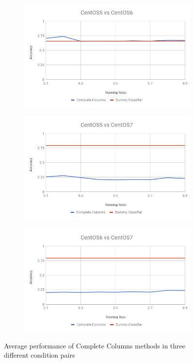 \documentclass[10pt, conference, compsocconf]{IEEEtran}
\begin{document}
\begin{figure}[h!]
        \centering
        \begin{subfigure}[b]{0.8\linewidth}
                \includegraphics[width=\columnwidth]{figures/ALS/columns-ALS-5vs6-PFS}
        \end{subfigure}
        \begin{subfigure}[b]{0.8\linewidth}
                \includegraphics[width=\columnwidth]{figures/ALS/columns-ALS-5vs7-PFS}
        \end{subfigure}
        \begin{subfigure}[b]{0.8\linewidth}
                \includegraphics[width=\columnwidth]{figures/ALS/columns-ALS-6vs7-PFS}
        \end{subfigure}
        \caption{Average performance of Complete Columns methods in three different condition pairs}
        \label{fig:columns method}
\end{figure}
\end{document}
